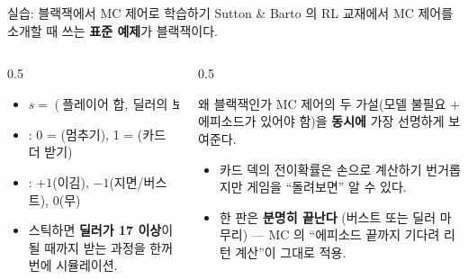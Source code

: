 \begin{frame}{실습: 블랙잭에서 MC 제어로 학습하기}
  Sutton \& Barto 의 RL 교재에서 MC 제어를 소개할 때 쓰는
  \textbf{표준 예제}가 블랙잭이다.
  \begin{columns}[T]
    \begin{column}{0.5\textwidth}
      \begin{itemize}
        \item {} $s = (\text{플레이어 합},\ \text{딜러의
          보이는 카드})$
        \item {}: 0 = (멈추기), 1 = (카드
          더 받기)
        \item {}: $+1$(이김), $-1$(지면/버스트), $0$(무)
        \item 스틱하면 \textbf{딜러가 17 이상}이 될 때까지
          받는 과정을 한꺼번에 시뮬레이션.
      \end{itemize}
    \end{column}
    \begin{column}{0.5\textwidth}
      \begin{block}{왜 블랙잭인가}
        MC 제어의 두 가설(모델 불필요 + 에피소드가 있어야
        함)을 \textbf{동시에} 가장 선명하게 보여준다.
        \begin{itemize}
          \item 카드 덱의 전이확률은 손으로 계산하기 번거롭지만
            게임을 ``돌려보면'' 알 수 있다.
          \item 한 판은 \textbf{분명히 끝난다} (버스트 또는
            딜러 마무리) --- MC 의 ``에피소드 끝까지 기다려
            리턴 계산''이 그대로 적용.
        \end{itemize}
      \end{block}
    \end{column}
  \end{columns}
\end{frame}
